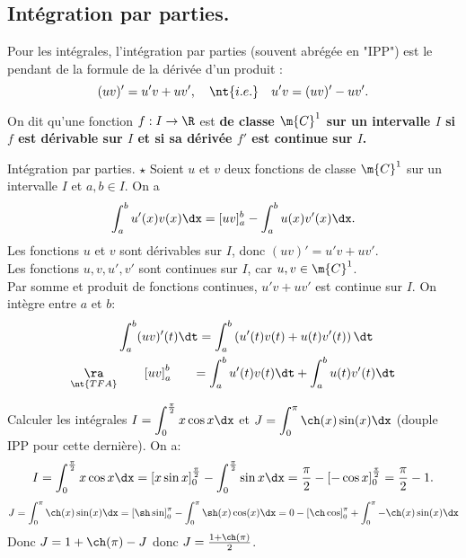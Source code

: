 \documentclass[11pt]{article}
\begin{document}
\subsection{Intégration par parties.}

Pour les intégrales, l'intégration par parties (souvent abrégée en "IPP") est le pendant de la formule de la dérivée d'un produit :
\begin{equation*}
    (uv)'=u'v+uv',\quad \nt{i.e.} \quad u'v=(uv)'-uv'.
\end{equation*}

\begin{defi}{}{}
    On dit qu'une fonction $f:I\to\R$ est \bf{de classe $\m{C}^1$} sur un intervalle $I$ si $f$ est dérivable sur $I$ et si sa dérivée $f'$ est continue sur $I$.
\end{defi}

\pagebreak

\begin{thm}{Intégration par parties. $\star$}{}
    Soient $u$ et $v$ deux fonctions de classe $\m{C}^1$ sur un intervalle $I$ et $a,b\in I$. On a
    \begin{equation*}
        \int_a^bu'(x)v(x)\dx = [uv]_a^b-\int_a^bu(x)v'(x)\dx.
    \end{equation*}
    \tcblower
    Les fonctions $u$ et $v$ sont dérivables sur $I$, donc $(uv)'=u'v+uv'$.\\
    Les fonctions $u,v,u',v'$ sont continues sur $I$, car $u,v\in\m{C}^1$.\\
    Par somme et produit de fonctions continues, $u'v+uv'$ est continue sur $I$. On intègre entre $a$ et $b$:
    \begin{align*}
        &\int_a^b(uv)'(t)\dt=\int_a^b\left(u'(t)v(t)+u(t)v'(t)\right)\dt\\
        \underset{\nt{TFA}}{\ra}&\hspace{0.7cm}\left[ uv \right]_a^b\hspace*{0.6cm}=\int_a^bu'(t)v(t)\dt+\int_a^bu(t)v'(t)\dt
    \end{align*}
\end{thm}

\begin{ex}{}{}
    Calculer les intégrales $\displaystyle I= \int_0^\frac{\pi}{2}x\cos x\dx$ et $\displaystyle J=\int_0^\pi\ch(x)\sin(x)\dx$ (douple IPP pour cette dernière).
    \tcblower
    On a:
    \begin{equation*}
        I=\int_0^\frac{\pi}{2}x\cos x\dx = \left[ x\sin x \right]_0^\frac{\pi}{2}-\int_0^\frac{\pi}{2}\sin x\dx=\frac{\pi}{2}-\left[ -\cos x \right]_0^\frac{\pi}{2}=\frac{\pi}{2}-1.
    \end{equation*}
    \begin{equation*}
        J=\int_0^\pi\ch(x)\sin(x)\dx=\left[ \sh\sin \right]_0^\pi - \int_0^\pi\sh(x)\cos(x)\dx=0-\left[ \ch\cos \right]_0^\pi+\int_0^\pi-\ch(x)\sin(x)\dx
    \end{equation*}
    Donc $J=1+\ch(\pi)-J$ donc $J=\frac{1+\ch(\pi)}{2}$.
\end{ex}
\end{document}
